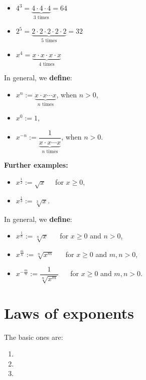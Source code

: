 \documentclass[
  12pt,
  oneside]{book}
\providecommand{\tightlist}{%
  \setlength{\itemsep}{0pt}\setlength{\parskip}{0pt}}
\theoremstyle{definition}
\theoremstyle{definition}
\theoremstyle{definition}
\theoremstyle{definition}
\theoremstyle{remark}
\begin{document}
\begin{itemize}
\tightlist
\item
  \(4^3=\underbrace{4\cdot4\cdot4}_{3\text{ times}}=64\)
\item
  \(2^5=\underbrace{2\cdot2\cdot2\cdot2\cdot2}_{5\text{ times}}=32\)
\item
  \(x^4=\underbrace{x\cdot x\cdot x\cdot x}_{4\text{ times}}\)
\end{itemize}

In general, we \textbf{define}:

\begin{itemize}
\tightlist
\item
  \(x^n := \underbrace{x\cdot x\cdots x}_{n\text{ times}}\), when \(n>0\),
\item
  \(x^0 := 1\),
\item
  \(x^{-n} := \dfrac{1}{\underbrace{x\cdot x\cdots x}_{n\text{ times}}}\), when \(n>0\).
\end{itemize}

\textbf{Further examples:}

\begin{itemize}
\tightlist
\item
  \(x^{\frac{1}{2}} := \sqrt{x}\)~~ for \(x\geq 0\),
\item
  \(x^{\frac{1}{3}} := \sqrt[3]{x}\).
\end{itemize}

In general, we \textbf{define}:

\begin{itemize}
\tightlist
\item
  \(x^{\frac{1}{n}} := \sqrt[n]{x}\) ~~ for \(x\geq0\) and \(n>0\),
\item
  \(x^{\frac{m}{n}} := \sqrt[n]{x^m}\) ~~ for \(x\geq0\) and \(m,n>0\),
\item
  \(x^{-\frac{m}{n}} := \dfrac{1}{\sqrt[n]{x^m}}\) ~~ for \(x\geq0\) and \(m,n>0\).
\end{itemize}

\hypertarget{laws-of-exponents}{%
\section{Laws of exponents}\label{laws-of-exponents}}

The basic ones are:

\begin{enumerate}
\def\labelenumi{\arabic{enumi}.}
\item
\item
\item
\end{enumerate}
\end{document}
